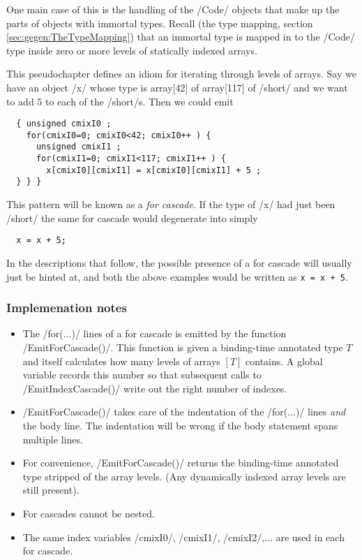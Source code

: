 \begin{docpart}
One main case of this is the handling of the /Code/ objects that make
up the parts of objects with immortal types. Recall (the type mapping,
section \ref{sec:gegen:TheTypeMapping}) that an immortal type is
mapped in \Pgen{} to the /Code/ type inside zero or more levels of
statically indexed arrays.

This pseudochapter defines an idiom for iterating through levels of
arrays. Say we have an object /x/ whose \Pgen{} type is array[42] of
array[117] of /short/ and we want to add 5 to each of the /short/s.
Then we could emit
\begin{verbatim}
  { unsigned cmixI0 ;
    for(cmixI0=0; cmixI0<42; cmixI0++ ) {
      unsigned cmixI1 ;
      for(cmixI1=0; cmixI1<117; cmixI1++ ) {
        x[cmixI0][cmixI1] = x[cmixI0][cmixI1] + 5 ;
  } } }
\end{verbatim}

This pattern will be known as a \emph{for cascade}. If the type of /x/
had just been /short/ the same for cascade would degenerate into
simply
\begin{verbatim}
  x = x + 5;
\end{verbatim}

In the descriptions that follow, the possible presence of a for
cascade will usually just be hinted at, and both the above examples
would be written as \texttt{x = x + 5}.

\subsubsection{Implemenation notes}
\begin{itemize}
\item The /for(...)/ lines of a for cascade is emitted by the function
      /EmitForCascade()/. This function is given a binding-time
      annotated type $T$ and itself calculates how many levels of
      arrays $[T]$ contains. A global variable records this number so
      that subsequent calls to /EmitIndexCascade()/ write out the
      right number of indexes.
\item /EmitForCascade()/ takes care of the indentation of the
      /for(...)/ lines \emph{and} the body line. The indentation
      will be wrong if the body statement spans multiple lines.
\item For convenience, /EmitForCascade()/ returns the binding-time
      annotated type stripped of the array levels. (Any dynamically
      indexed array levels are still present).
\item For cascades cannot be nested.
\item The same index variables /cmixI0/, /cmixI1/, /cmixI2/,$\ldots$
      are used in each for cascade.
\end{itemize}


\end{docpart}
